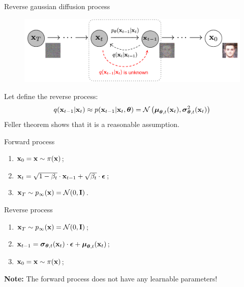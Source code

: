 \begin{frame}{Reverse gaussian diffusion process}
	\vspace{-0.3cm} 
	\begin{figure}
		\includegraphics[width=0.8\linewidth]{figs/DDPM}
	\end{figure}
	\vspace{-0.3cm} 
	Let define the reverse process: 
	\vspace{-0.2cm}
	\[
		q(\mathbf{x}_{t-1}|\mathbf{x}_{t}) \approx p(\mathbf{x}_{t - 1} | \mathbf{x}_t, \boldsymbol{\theta}) = \mathcal{N} \left(\boldsymbol{\mu}_{\boldsymbol{\theta}, t}(\mathbf{x}_t), \boldsymbol{\sigma}_{\boldsymbol{\theta}, t}^2(\mathbf{x}_t)\right)
	\]
	{\color{gray}Feller theorem shows that it is a reasonable assumption.}
	\begin{minipage}{0.5\linewidth}
		\begin{block}{Forward process}
			\begin{enumerate}
				\item $\mathbf{x}_0 = \mathbf{x} \sim \pi(\mathbf{x})$;
				\item $\mathbf{x}_t = \sqrt{1 - \beta_t} \cdot \mathbf{x}_{t - 1} + \sqrt{\beta_t} \cdot \boldsymbol{\epsilon}$;
				\item $\mathbf{x}_T \sim p_{\infty}(\mathbf{x}) = \mathcal{N}(0, \mathbf{I})$.
			\end{enumerate}
		\end{block}
	\end{minipage}%
	\begin{minipage}{0.55\linewidth}
		\begin{block}{Reverse process}
			\begin{enumerate}
				\item $\mathbf{x}_T \sim p_{\infty}(\mathbf{x}) = \mathcal{N}(0, \mathbf{I})$;
				\item $\mathbf{x}_{t - 1} = \boldsymbol{\sigma}_{\boldsymbol{\theta}, t}(\mathbf{x}_t) \cdot \boldsymbol{\epsilon} + \boldsymbol{\mu}_{\boldsymbol{\theta}, t}(\mathbf{x}_t)$;
				\item $\mathbf{x}_0 = \mathbf{x} \sim \pi(\mathbf{x})$;
			\end{enumerate}
		\end{block}
	\end{minipage}
	\textbf{Note:} The forward process does not have any learnable parameters!
\end{frame}

